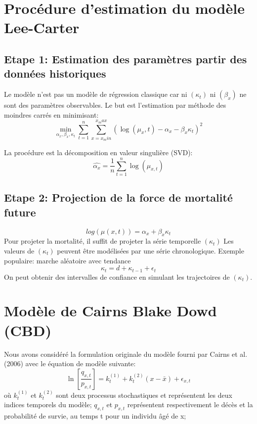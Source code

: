 \section{Procédure d'estimation du modèle Lee-Carter}
\subsection{Etape 1: Estimation des paramètres partir des données historiques}
Le modèle n'est pas un modèle de régression classique car ni $(\kappa_t)$ ni $(\beta_x)$  ne sont des paramètres observables.
Le but est l'estimation par méthode des moindres carrés en minimisant:
\begin{equation}
  \min_{\alpha_x,\beta_x,\kappa_t} \sum_{t=1}^{n} \sum_{x=x_min}^{x_max}(\log(\mu_x,t)-\alpha_x-\beta_x\kappa_t)^2
\end{equation}

La procédure est la décomposition en valeur singulière (SVD):
\begin{equation}
\hat{\alpha_x} = \frac{1}{n} \sum_{t=1}^{n} \log(\mu_{x,t})
\end{equation}

\subsection{Etape 2: Projection de la force de mortalité future}
\begin{equation}
log(\mu(x,t)) = \alpha_x + \beta_x\kappa_t
\end{equation}
Pour projeter la mortalité, il suffit de projeter la série temporelle $(\kappa_t)$
Les valeurs de $(\kappa_t)$ peuvent être modélisées par une série chronologique.
Exemple populaire: marche aléatoire avec tendance
\begin{equation}
\kappa_t = d + \kappa_{t-1} + \epsilon_t
\end{equation}
On peut obtenir des intervalles de confiance en simulant les
trajectoires de $(\kappa_t)$.
\section{Modèle de Cairns Blake Dowd (CBD)}
Nous avons considéré la formulation originale du modèle fourni par Cairns et al.(2006) avec le
équation de modèle suivante:
\begin{equation}
\ln[\frac{q_{x,t}}{p_{x,t}}] = k_t^{(1)} + k_t^{(2)} (x - \bar{x}) + \epsilon_{x,t}
\end{equation}
où
$k_t^{(1)}$ et $k_t^{(2)}$ sont deux processus stochastiques et représentent les deux indices temporels du modèle;
$q_{x,t}$ et $p_{x,t}$ représentent respectivement le décès et la probabilité de survie, au temps t pour un individu âgé de x;

